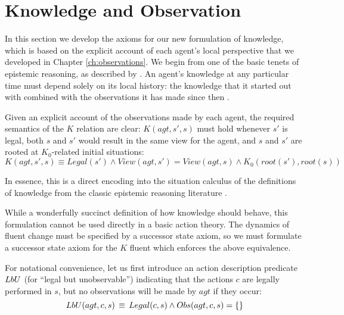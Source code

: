 \section{Knowledge and Observation\label{sec:Knowledge:Observation}}

In this section we develop the axioms for our new formulation of knowledge,
which is based on the explicit account of each agent's local perspective
that we developed in Chapter \ref{ch:observations}. We begin from
one of the basic tenets of epistemic reasoning, as described by \citep{halpern90knowledge_distrib}.
An agent's knowledge at any particular time must depend solely on
its local history: the knowledge that it started out with combined
with the observations it has made since then .

Given an explicit account of the observations made by each agent,
the required semantics of the $K$ relation are clear: $K(agt,s',s)$
must hold whenever $s'$ is legal, both $s$ and $s'$ would result
in the same view for the agent, and $s$ and $s'$ are rooted at $K_{0}$-related
initial situations:\begin{equation}
K(agt,s',s)\equiv Legal(s')\wedge View(agt,s')=View(agt,s)\wedge K_{0}(root(s'),root(s))\label{eq:k-desired}\end{equation}


In essence, this is a direct encoding into the situation calculus
of the definitions of knowledge from the classic epistemic reasoning
literature \citep{parikh85dist_knowledge,halpern90knowledge_distrib,fagin95}.

While a wonderfully succinct definition of how knowledge should behave,
this formulation cannot be used directly in a basic action theory.
The dynamics of fluent change must be specified by a successor state
axiom, so we must formulate a successor state axiom for the $K$ fluent
which enforces the above equivalence.

For notational convenience, let us first introduce an action description
predicate $LbU$ (for {}``legal but unobservable'') indicating
that the actions $c$ are legally performed in $s$, but no observations
will be made by $agt$ if they occur:\begin{equation}
LbU(agt,c,s)\,\equiv\, Legal(c,s)\wedge Obs(agt,c,s)=\{\}\label{eqn:LbU_defn}\end{equation}


